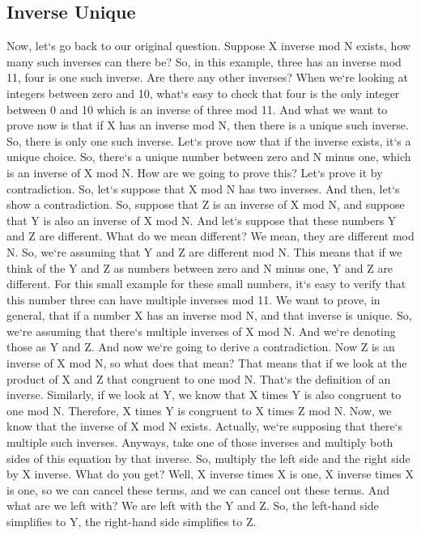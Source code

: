 \subsection{Inverse  Unique}
Now, let`s go back to our original question.
Suppose X inverse mod N exists, how many such inverses can there be? So, in this example, three has an inverse mod 11, four is one such inverse.
Are there any other inverses? When we`re looking at integers between zero and 10, what`s easy to check that four is the only integer between 0 and 10 which is an inverse of three mod 11.
And what we want to prove now is that if X has an inverse mod N, then there is a unique such inverse.
So, there is only one such inverse.
Let`s prove now that if the inverse exists, it`s a unique choice.
So, there`s a unique number between zero and N minus one, which is an inverse of X mod N\@.
How are we going to prove this? Let`s prove it by contradiction.
So, let`s suppose that X mod N has two inverses.
And then, let`s show a contradiction.
So, suppose that Z is an inverse of X mod N, and suppose that Y is also an inverse of X mod N\@.
And let`s suppose that these numbers Y and Z are different.
What do we mean different? We mean, they are different mod N\@.
So, we`re assuming that Y and Z are different mod N\@.
This means that if we think of the Y and Z as numbers between zero and N minus one, Y and Z are different.
For this small example for these small numbers, it`s easy to verify that this number three can have multiple inverses mod 11.
We want to prove, in general, that if a number X has an inverse mod N, and that inverse is unique.
So, we`re assuming that there`s multiple inverses of X mod N\@.
And we`re denoting those as Y and Z\@.
And now we`re going to derive a contradiction.
Now Z is an inverse of X mod N, so what does that mean? That means that if we look at the product of X and Z that congruent to one mod N\@.
That`s the definition of an inverse.
Similarly, if we look at Y, we know that X times Y is also congruent to one mod N\@.
Therefore, X times Y is congruent to X times Z mod N\@.
Now, we know that the inverse of X mod N exists.
Actually, we`re supposing that there`s multiple such inverses.
Anyways, take one of those inverses and multiply both sides of this equation by that inverse.
So, multiply the left side and the right side by X inverse.
What do you get? Well, X inverse times X is one, X inverse times X is one, so we can cancel these terms, and we can cancel out these terms.
And what are we left with? We are left with the Y and Z\@.
So, the left-hand side simplifies to Y, the right-hand side simplifies to Z\@.
